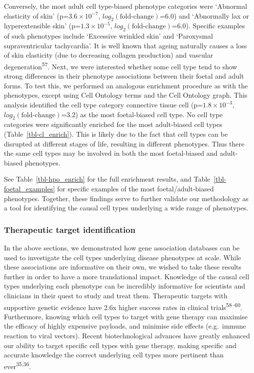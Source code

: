 \documentclass[
]{article}
\begin{document}
Conversely, the most adult cell type-biased phenotype categories were
`Abnormal elasticity of skin' (p=\(3.6 \times 10^{-7}\),
\(log_2(\text{fold-change})\)=\(6.0\)) and `Abnormally lax or
hyperextensible skin' (p=\(1.3 \times 10^{-5}\),
\(log_2(\text{fold-change})\)=\(6.0\)). Specific examples of such
phenotypes include `Excessive wrinkled skin' and `Paroxysmal
supraventricular tachycardia'. It is well known that ageing naturally
causes a loss of skin elasticity (due to decreasing collagen production)
and vascular degeneration\textsuperscript{57}. Next, we were interested
whether some cell type tend to show strong differences in their
phenotype associations between their foetal and adult forms. To test
this, we performed an analogous enrichment procedure as with the
phenotypes, except using Cell Ontology terms and the Cell Ontology
graph. This analysis identified the cell type category connective tissue
cell (p=\(1.8 \times 10^{-3}\), \(log_2(\text{fold-change})\)=\(3.2\))
as the most foetal-biased cell type. No cell type categories were
significantly enriched for the most adult-biased cell types
(Table~\ref{tbl-cl_enrich}). This is likely due to the fact that cell
types can be disrupted at different stages of life, resulting in
different phenotypes. Thus there the same cell types may be involved in
both the most foetal-biased and adult-biased phenotypes.

See Table~\ref{tbl-hpo_enrich} for the full enrichment results, and
Table~\ref{tbl-foetal_examples} for specific examples of the most
foetal/adult-biased phenotypes. Together, these findings serve to
further validate our methodology as a tool for identifying the causal
cell types underlying a wide range of phenotypes.

\subsubsection{Therapeutic target
identification}\label{therapeutic-target-identification}

In the above sections, we demonstrated how gene association databases
can be used to investigate the cell types underlying disease phenotypes
at scale. While these associations are informative on their own, we
wished to take these results further in order to have a more
translational impact. Knowledge of the causal cell types underlying each
phenotype can be incredibly informative for scientists and clinicians in
their quest to study and treat them. Therapeutic targets with supportive
genetic evidence have 2.6x higher success rates in clinical
trials\textsuperscript{58--60}. Furthermore, knowing which cell types to
target with gene therapy can maximise the efficacy of highly expensive
payloads, and minimise side effects (e.g.~immune reaction to viral
vectors). Recent biotechnological advances have greatly enhanced our
ability to target specific cell types with gene therapy, making specific
and accurate knowledge the correct underlying cell types more pertinent
than ever\textsuperscript{35,36}.
\end{document}
